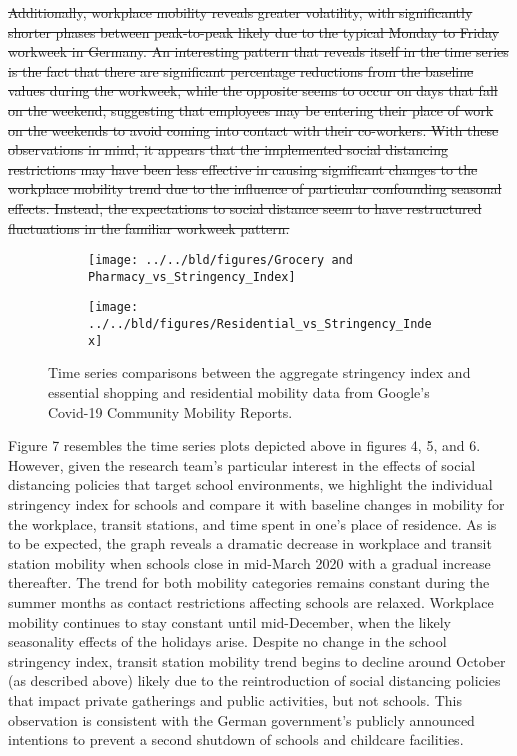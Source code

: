 \sout{Additionally, workplace mobility reveals greater volatility, with significantly shorter phases between peak-to-peak likely due to the typical Monday to Friday workweek in Germany. An interesting pattern that reveals itself in the time series is the fact that there are significant percentage reductions from the baseline values during the workweek, while the opposite seems to occur on days that fall on the weekend, suggesting that employees may be entering their place of work on the weekends to avoid coming into contact with their co-workers. With these observations in mind, it appears that the implemented social distancing restrictions may have been less effective in causing significant changes to the workplace mobility trend due to the influence of particular confounding seasonal effects. Instead, the expectations to social distance seem to have restructured fluctuations in the familiar workweek pattern.}

\begin{figure}[H]
     \centering
     \begin{subfigure}[b]{\textwidth}
         \centering
         \texttt{[image: ../../bld/figures/Grocery and Pharmacy\_vs\_Stringency\_Index]}
         \caption{}
         \label{fig:essentialshopping}
     \end{subfigure}
     \hfill
     \begin{subfigure}[b]{\textwidth}
         \centering
         \texttt{[image: ../../bld/figures/Residential\_vs\_Stringency\_Index]}
         \caption{}
         \label{fig:residential}
     \end{subfigure}
        \caption{Time series comparisons between the aggregate stringency index and essential shopping and residential mobility data from Google's Covid-19 Community Mobility Reports.}
         \label{fig:four graphs}
\end{figure}

Figure 7 resembles the time series plots depicted above in figures 4, 5, and 6. However, given the research team’s particular interest in the effects of social distancing policies that target school environments, we highlight the individual stringency index for schools and compare it with baseline changes in mobility for the workplace, transit stations, and time spent in one’s place of residence. As is to be expected, the graph reveals a dramatic decrease in workplace and transit station mobility when schools close in mid-March 2020 with a gradual increase thereafter. The trend for both mobility categories remains constant during the summer months as contact restrictions affecting schools are relaxed. Workplace mobility continues to stay constant until mid-December, when the likely seasonality effects of the holidays arise. Despite no change in the school stringency index, transit station mobility trend begins to decline around October (as described above) likely due to the reintroduction of social distancing policies that impact private gatherings and public activities, but not schools. This observation is consistent with the German government’s publicly announced intentions to prevent a second shutdown of schools and childcare facilities.

